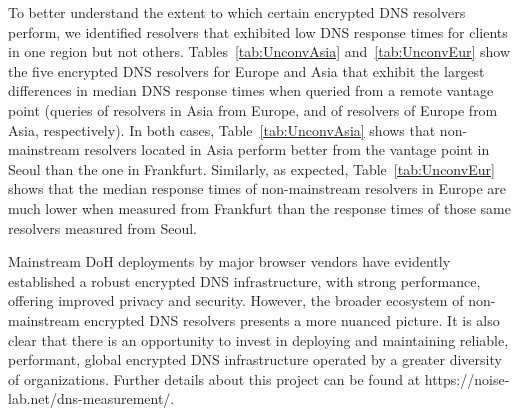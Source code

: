 To better understand the extent to which certain encrypted DNS resolvers
perform, we identified
resolvers that exhibited low DNS response times for clients in one region
but not others. 
Tables~\ref{tab:UnconvAsia} and~\ref{tab:UnconvEur} show 
the five encrypted DNS resolvers for Europe and Asia that exhibit the 
largest differences in median DNS response times when
queried from a remote vantage point (queries of resolvers in Asia from Europe,
and of resolvers of Europe from Asia, respectively). In both cases, 
Table~\ref{tab:UnconvAsia} shows that non-mainstream resolvers located
in Asia perform better from the vantage point in Seoul than the one in
Frankfurt.  Similarly, as expected, Table~\ref{tab:UnconvEur} shows that the
median response times of non-mainstream resolvers in Europe are much lower when
measured from Frankfurt than the response times of those same resolvers
measured from Seoul.

Mainstream DoH deployments by major browser vendors have evidently established a robust encrypted DNS infrastructure, with strong performance, offering improved privacy and security. However, the broader ecosystem of non-mainstream encrypted DNS resolvers presents a more nuanced picture. 
It is also clear that there is an opportunity
to invest in deploying and maintaining reliable, performant, global encrypted
DNS infrastructure operated by a greater diversity of organizations. Further details about this project can be found at https://noise-lab.net/dns-measurement/.
